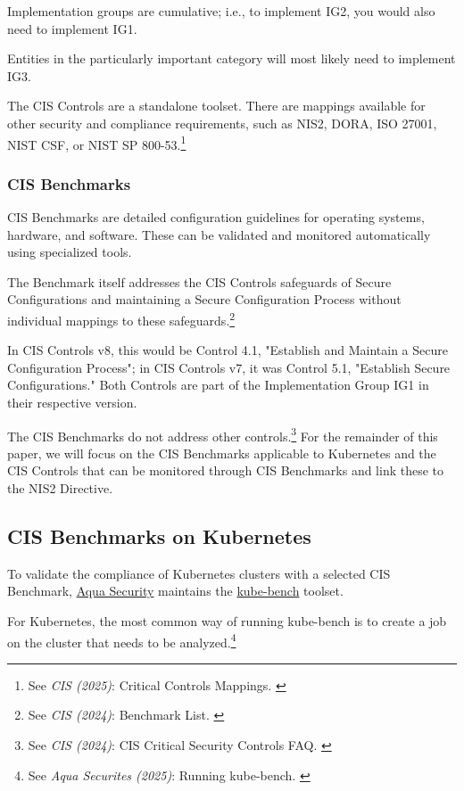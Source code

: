 Implementation groups are cumulative; i.e., to implement IG2, you would also need to implement IG1.

Entities in the particularly important category will most likely need to implement IG3.

The CIS Controls are a standalone toolset. There are mappings available for other security and compliance requirements, such as NIS2, DORA, ISO 27001, NIST CSF, or NIST SP 800-53.\footnote{See \textit{CIS (2025)}: Critical Controls Mappings. \cite{cisMappings}}

\subsubsection{CIS Benchmarks}

CIS Benchmarks are detailed configuration guidelines for operating systems, hardware, and software. These can be validated and monitored automatically using specialized tools.

The Benchmark itself addresses the CIS Controls safeguards of Secure
Configurations and maintaining a Secure Configuration Process without individual mappings to these safeguards.\footnote{See \textit{CIS (2024)}: Benchmark List. \cite{cisBenchmarks}}

In CIS Controls v8, this would be Control 4.1, "Establish and Maintain a Secure Configuration Process"; in CIS Controls v7, it was Control 5.1, "Establish Secure Configurations." Both Controls are part of the Implementation Group IG1 in their respective version.

The CIS Benchmarks do not address other controls.\footnote{See \textit{CIS (2024)}: CIS Critical Security Controls FAQ. \cite{cisFaq}} For the remainder of this paper, we will focus on the CIS Benchmarks applicable to Kubernetes and the CIS Controls that can be monitored through CIS Benchmarks and link these to the NIS2 Directive.

\subsection{CIS Benchmarks on Kubernetes}

To validate the compliance of Kubernetes clusters with a selected CIS Benchmark, \href{https://www.aquasec.com/}{Aqua Security} maintains the \href{https://github.com/aquasecurity/kube-bench}{kube-bench} toolset.

For Kubernetes, the most common way of running kube-bench is to create a job on the cluster that needs to be analyzed.\footnote{See \textit{Aqua Securites (2025)}: Running kube-bench. \cite{kubeBench}}

